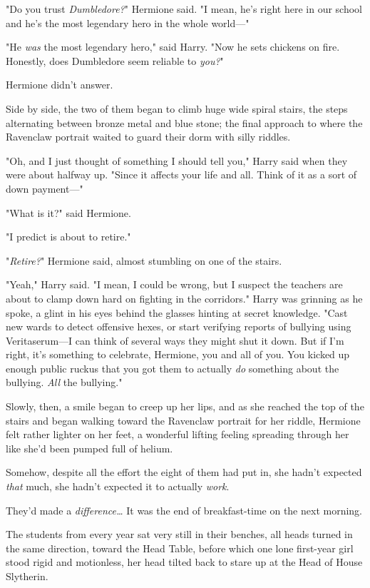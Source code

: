 "Do you trust \emph{Dumbledore?}" Hermione said. "I mean, he's right here in 
our school and he's the most legendary hero in the whole world---"

"He \emph{was} the most legendary hero," said Harry. "Now he sets chickens on 
fire. Honestly, does Dumbledore seem reliable to \emph{you?}"

Hermione didn't answer.

Side by side, the two of them began to climb huge wide spiral stairs, the steps 
alternating between bronze metal and blue stone; the final approach to where 
the Ravenclaw portrait waited to guard their dorm with silly riddles.

"Oh, and I just thought of something I should tell you," Harry said when they 
were about halfway up. "Since it affects your life and all. Think of it as a 
sort of down payment---"

"What is it?" said Hermione.

"I predict \SPHEW is about to retire."

"\emph{Retire?}" Hermione said, almost stumbling on one of the stairs.

"Yeah," Harry said. "I mean, I could be wrong, but I suspect the teachers are 
about to clamp down hard on fighting in the corridors." Harry was grinning as 
he spoke, a glint in his eyes behind the glasses hinting at secret knowledge. 
"Cast new wards to detect offensive hexes, or start verifying reports of 
bullying using Veritaserum---I can think of several ways they might shut it 
down. But if I'm right, it's something to celebrate, Hermione, you and all of 
you. You kicked up enough public ruckus that you got them to actually \emph{do} 
something about the bullying. \emph{All} the bullying."

Slowly, then, a smile began to creep up her lips, and as she reached the top of 
the stairs and began walking toward the Ravenclaw portrait for her riddle, 
Hermione felt rather lighter on her feet, a wonderful lifting feeling spreading 
through her like she'd been pumped full of helium.

Somehow, despite all the effort the eight of them had put in, she hadn't 
expected \emph{that} much, she hadn't expected it to actually \emph{work}.

They'd made a \emph{difference{\ldots}}
\sbreak
It was the end of breakfast-time on the next morning.

The students from every year sat very still in their benches, all heads turned 
in the same direction, toward the Head Table, before which one lone first-year 
girl stood rigid and motionless, her head tilted back to stare up at the Head 
of House Slytherin.

